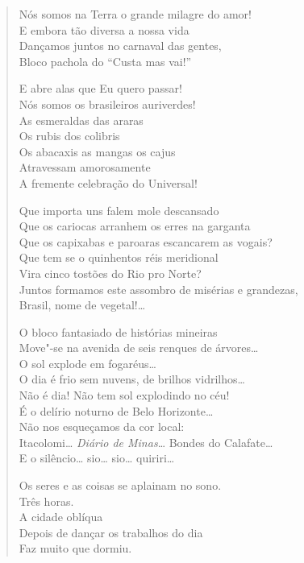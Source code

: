 \begin{verse}
Nós somos na Terra o grande milagre do amor!\\
E embora tão diversa a nossa vida\\
Dançamos juntos no carnaval das gentes,\\
Bloco pachola do ``Custa mas vai!''

E abre alas que Eu quero passar!\\
Nós somos os brasileiros auriverdes!\\
As esmeraldas das araras\\
Os rubis dos colibris\\
Os abacaxis as mangas os cajus\\
Atravessam amorosamente\\
A fremente celebração do Universal!

Que importa uns falem mole descansado\\
Que os cariocas arranhem os erres na garganta\\
Que os capixabas e paroaras escancarem as vogais?\\
Que tem se o quinhentos réis meridional\\
Vira cinco tostões do Rio pro Norte?\\
Juntos formamos este assombro de misérias e grandezas,\\
Brasil, nome de vegetal!\ldots{}

O bloco fantasiado de histórias mineiras\\
Move"-se na avenida de seis renques de árvores\ldots{}\\
O sol explode em fogaréus\ldots{}\\
O dia é frio sem nuvens, de brilhos vidrilhos\ldots{}\\
Não é dia! Não tem sol explodindo no céu!\\
É o delírio noturno de Belo Horizonte\ldots{}\\
Não nos esqueçamos da cor local:\\
Itacolomi\ldots{} \emph{Diário de Minas}\ldots{} Bondes do Calafate\ldots{}\\
E o silêncio\ldots{} sio\ldots{} sio\ldots{} quiriri\ldots{}

Os seres e as coisas se aplainam no sono.\\
Três horas.\\
A cidade oblíqua\\
Depois de dançar os trabalhos do dia\\
Faz muito que dormiu.


\end{verse}
